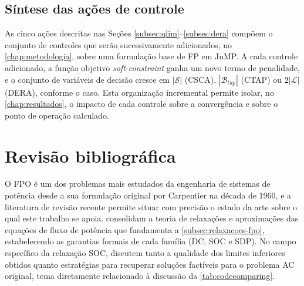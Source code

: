 \subsection{Síntese das ações de controle}
\label{subsec:sintese-controles}

As cinco ações descritas nas Seções \ref{subsec:qlim}--\ref{subsec:dera} compõem o conjunto de controles que serão sucessivamente adicionados, no \autoref{chap:metodologia}, sobre uma formulação base de FP em JuMP. A cada controle adicionado, a função objetivo \textit{soft-constraint} ganha um novo termo de penalidade, e o conjunto de variáveis de decisão cresce em $|\mathcal{S}|$ (CSCA), $|\mathcal{B}_{tap}|$ (CTAP) ou $2|\mathcal{L}|$ (DERA), conforme o caso. Esta organização incremental permite isolar, no \autoref{chap:resultados}, o impacto de cada controle sobre a convergência e sobre o ponto de operação calculado.

\section{Revisão bibliográfica}
\label{sec:revisao-bibliografica}

O FPO é um dos problemas mais estudados da engenharia de sistemas de potência desde a sua formulação original por Carpentier na década de 1960, e a literatura de revisão recente permite situar com precisão o estado da arte sobre o qual este trabalho se apoia.  consolidam a teoria de relaxações e aproximações das equações de fluxo de potência que fundamenta a \autoref{subsec:relaxacoes-fpo}, estabelecendo as garantias formais de cada família (DC, SOC e SDP). No campo específico da relaxação SOC,  discutem tanto a qualidade dos limites inferiores obtidos quanto estratégias para recuperar soluções factíveis para o problema AC original, tema diretamente relacionado à discussão da \autoref{tab:codecomparing}.

